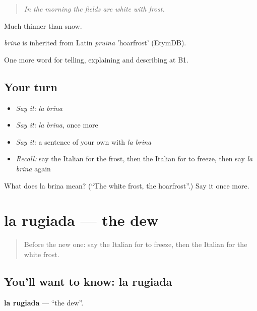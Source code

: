 \begin{quote}
\emph{In the morning the fields are white with frost.}
\end{quote}

Much thinner than snow.

\begin{cousinweb}
\emph{brina} is inherited from Latin \emph{pruīna} 'hoarfrost' (EtymDB).
\end{cousinweb}

\begin{grammarlens}[title={What you've built}]
One more word for telling, explaining and describing at B1.
\end{grammarlens}

\subsection*{Your turn}
\begin{itemize}
\raggedright
  \item \emph{Say it:} \emph{la brina}
  \item \emph{Say it:} \emph{la brina}, once more
  \item \emph{Say it:} a sentence of your own with \emph{la brina}
  \item \emph{Recall:} say the Italian for the frost, then the Italian for to freeze, then say \emph{la brina} again
\end{itemize}

\begin{tcolorbox}[breakable,colback=teal!4,colframe=teal!35!black,title={Before you move on}]
What does la brina mean? (\textquotedblleft{}The white frost, the hoarfrost\textquotedblright{}.) Say it once more.
\end{tcolorbox}
\section[la rugiada]{la rugiada — the dew}

\label{lesson:IT-C468-rugiada}



\begin{quote}
Before the new one: say the Italian for to freeze, then the Italian for the white frost.
\end{quote}

\subsection*{You'll want to know: la rugiada}
\textbf{la rugiada} — \textquotedblleft{}the dew\textquotedblright{}.

